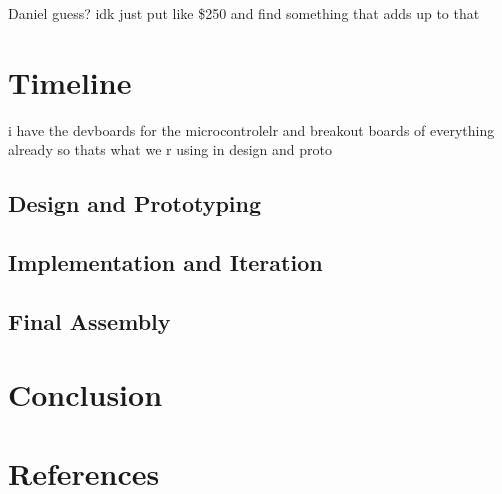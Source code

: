 \documentclass[11pt, letterpaper,titlepage]{article}
\begin{document}
Daniel guess? idk just put like \$250 and find something that adds up to that

\newpage
\section{Timeline}

i have the devboards for the microcontrolelr and breakout boards of everything already so thats what we r using in design and proto

\subsection{Design and Prototyping}

\subsection{Implementation and Iteration}

\subsection{Final Assembly}

\newpage
\section{Conclusion}



\newpage
\section{References}


\begingroup
\let\oldsection\section
\renewcommand{\section}[2]{}
\end{document}
